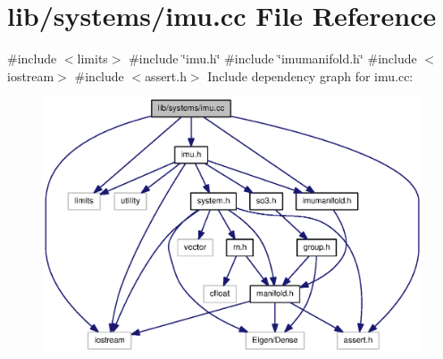 \section{lib/systems/imu.cc \-File \-Reference}
\label{imu_8cc}
{\ttfamily \#include $<$limits$>$}\*
{\ttfamily \#include \char`\"{}imu.\-h\char`\"{}}\*
{\ttfamily \#include \char`\"{}imumanifold.\-h\char`\"{}}\*
{\ttfamily \#include $<$iostream$>$}\*
{\ttfamily \#include $<$assert.\-h$>$}\*
\-Include dependency graph for imu.\-cc\-:\nopagebreak
\begin{figure}[H]
\begin{center}
\leavevmode
\includegraphics[width=350pt]{imu_8cc__incl}
\end{center}
\end{figure}
